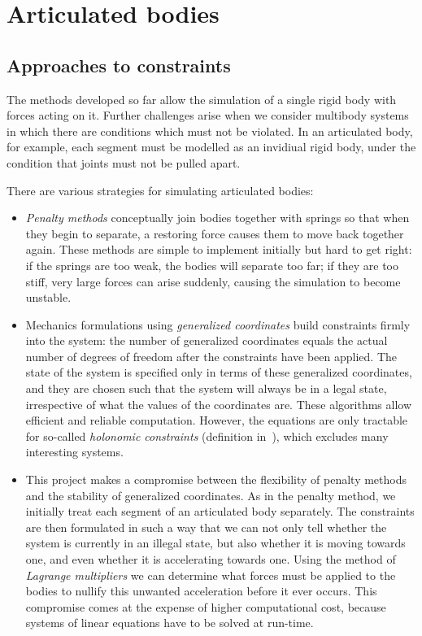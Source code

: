 \section{Articulated bodies\label{articulatedBodies}}

\subsection{Approaches to constraints\label{approachesToConstraints}}
The methods developed so far allow the simulation of a single rigid body with forces
acting on it. Further challenges arise when we consider multibody systems in which there are
conditions which must not be violated. In an articulated body, for example, each segment
must be modelled as an invidiual rigid body, under the condition that joints must not be pulled
apart.

There are various strategies for simulating articulated bodies:

\begin{itemize}
\item \emph{Penalty methods} conceptually join bodies together with springs so that when they
    begin to separate, a restoring force causes them to move back together again. These methods
    are simple to implement initially but hard to get right: if the springs are too weak, the
    bodies will separate too far; if they are too stiff, very large forces can arise suddenly,
    causing the simulation to become unstable.

\item Mechanics formulations using \emph{generalized coordinates}
    \cite{Hand:98,Goldstein:80,Featherstone:87,Wilhelms:91} build constraints firmly into
    the system: the number of generalized coordinates equals the actual number of degrees of
    freedom after the constraints have been applied. The state of the system is specified only in
    terms of these generalized coordinates, and they are chosen such that the system will always
    be in a legal state, irrespective of what the values of the coordinates are. These algorithms
    allow efficient and reliable computation. However, the equations are only tractable for
    so-called \emph{holonomic constraints} (definition in~\cite{Hand:98}), which excludes
    many interesting systems.

\item This project makes a compromise between the flexibility of penalty methods and the stability
    of generalized coordinates. As in the penalty method, we initially treat each segment of an
    articulated body separately. The constraints are then formulated in such a way that we can
    not only tell whether the system is currently in an illegal state, but also whether it is
    moving towards one, and even whether it is accelerating towards one. Using the method of
    \emph{Lagrange multipliers} we can determine what forces must be applied to the bodies to
    nullify this unwanted acceleration before it ever occurs. This compromise comes at the
    expense of higher computational cost, because systems of linear equations have to be solved
    at run-time.
\end{itemize}

